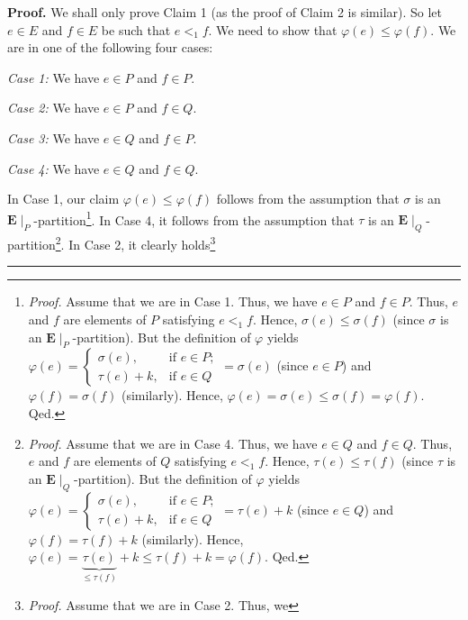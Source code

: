 \documentclass[numbers=enddot,12pt,final,onecolumn,notitlepage,abstracton]{scrartcl}
\theoremstyle{definition}
\newenvironment{proof}[1][Proof]{\noindent\textbf{#1.} }{\ \rule{0.5em}{0.5em}}
\newenvironment{verlong}{}{}
\newcommand{\EE}{{\mathbf{E}}}
\begin{document}
\begin{verlong}
\begin{proof}
We shall only prove Claim 1 (as the proof of Claim 2 is similar). So let $e\in
E$ and $f\in E$ be such that $e<_{1}f$. We need to show that $\varphi\left(
e\right)  \leq\varphi\left(  f\right)  $. We are in one of the following four cases:

\textit{Case 1:} We have $e\in P$ and $f\in P$.

\textit{Case 2:} We have $e\in P$ and $f\in Q$.

\textit{Case 3:} We have $e\in Q$ and $f\in P$.

\textit{Case 4:} We have $e\in Q$ and $f\in Q$.

In Case 1, our claim $\varphi\left(  e\right)  \leq\varphi\left(  f\right)  $
follows from the assumption that $\sigma$ is an $ \EE \mid_{P}%
$-partition\footnote{\textit{Proof.} Assume that we are in Case 1. Thus, we
have $e\in P$ and $f\in P$. Thus, $e$ and $f$ are elements of $P$ satisfying
$e<_{1}f$. Hence, $\sigma\left(  e\right)  \leq\sigma\left(  f\right)  $
(since $\sigma$ is an $ \EE \mid_{P}$-partition). But the definition of
$\varphi$ yields $\varphi\left(  e\right)  =%
\begin{cases}
\sigma\left(  e\right)  , & \text{if }e\in P;\\
\tau\left(  e\right)  +k, & \text{if }e\in Q
\end{cases}
=\sigma\left(  e\right)  $ (since $e\in P$) and $\varphi\left(  f\right)
=\sigma\left(  f\right)  $ (similarly). Hence, $\varphi\left(  e\right)
=\sigma\left(  e\right)  \leq\sigma\left(  f\right)  =\varphi\left(  f\right)
$. Qed.}. In Case 4, it follows from the assumption that $\tau$ is an
$ \EE \mid_{Q}$-partition\footnote{\textit{Proof.} Assume that we are
in Case 4. Thus, we have $e\in Q$ and $f\in Q$. Thus, $e$ and $f$ are elements
of $Q$ satisfying $e<_{1}f$. Hence, $\tau\left(  e\right)  \leq\tau\left(
f\right)  $ (since $\tau$ is an $ \EE \mid_{Q}$-partition). But the
definition of $\varphi$ yields $\varphi\left(  e\right)  =%
\begin{cases}
\sigma\left(  e\right)  , & \text{if }e\in P;\\
\tau\left(  e\right)  +k, & \text{if }e\in Q
\end{cases}
=\tau\left(  e\right)  +k$ (since $e\in Q$) and $\varphi\left(  f\right)
=\tau\left(  f\right)  +k$ (similarly). Hence, $\varphi\left(  e\right)
=\underbrace{\tau\left(  e\right)  }_{\leq\tau\left(  f\right)  }+k\leq
\tau\left(  f\right)  +k=\varphi\left(  f\right)  $. Qed.}. In Case 2, it
clearly holds\footnote{\textit{Proof.} Assume that we are in Case 2. Thus, we
}
\end{proof}
\end{verlong}
\end{document}
